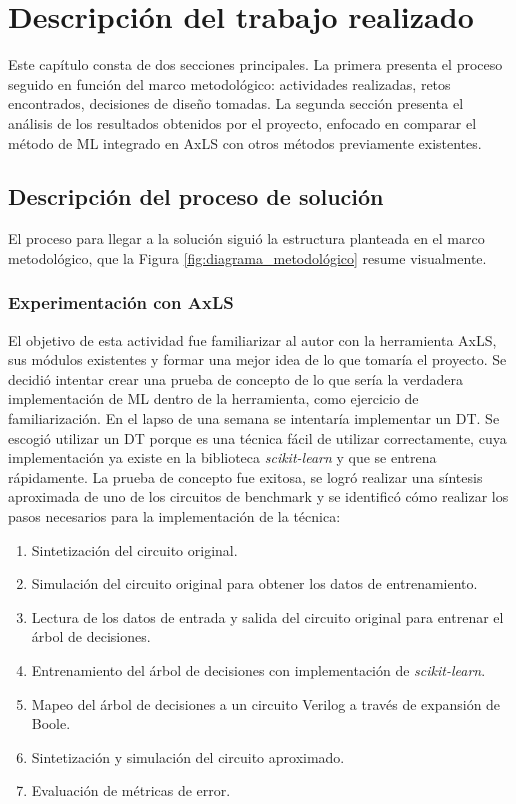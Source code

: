 \chapter{Descripción del trabajo realizado}

Este capítulo consta de dos secciones principales. La primera presenta el
proceso seguido en función del marco metodológico: actividades realizadas,
retos encontrados, decisiones de diseño tomadas. La segunda sección presenta el
análisis de los resultados obtenidos por el proyecto, enfocado en comparar el
método de ML integrado en AxLS con otros métodos previamente existentes.

\section{Descripción del proceso de solución}

El proceso para llegar a la solución siguió la estructura planteada en el marco
metodológico, que la Figura \ref{fig:diagrama_metodológico} resume visualmente.

\subsection{Experimentación con AxLS}

El objetivo de esta actividad fue familiarizar al autor con la herramienta
AxLS, sus módulos existentes y formar una mejor idea de lo que tomaría el
proyecto. Se decidió intentar crear una prueba de concepto de lo que sería la
verdadera implementación de ML dentro de la herramienta, como ejercicio de
familiarización.
En el lapso de una semana se intentaría implementar un DT. Se
escogió utilizar un DT porque es una técnica fácil de utilizar correctamente,
cuya implementación ya existe en la biblioteca \emph{scikit-learn} y que se
entrena rápidamente.
La prueba de concepto fue exitosa, se logró realizar una síntesis aproximada de
uno de los circuitos de benchmark y se identificó cómo realizar los pasos
necesarios para la implementación de la técnica:

\begin{enumerate}
  \item Sintetización del circuito original.
  \item Simulación del circuito original para obtener los datos de entrenamiento.
  \item Lectura de los datos de entrada y salida del circuito original para
    entrenar el árbol de decisiones.
  \item Entrenamiento del árbol de decisiones con implementación de
    \emph{scikit-learn}.
  \item Mapeo del árbol de decisiones a un circuito Verilog a través de
    expansión de Boole.
  \item Sintetización y simulación del circuito aproximado.
  \item Evaluación de métricas de error.
\end{enumerate}

